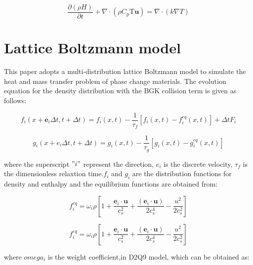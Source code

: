\begin{equation}\label {CE.C1}
\frac{\partial(\rho H)}{\partial t}+\nabla \cdot\left(\rho C_{\mathrm{p}} \mathrm{T} \boldsymbol{u}\right)=\nabla \cdot(k \nabla T)
\end{equation}
	

\section{Lattice Boltzmann model}
This paper adopts a multi-distribution lattice Boltzmann model to simulate the heat and mass transfer problem of phase change materials.   The evolution equation for the density distribution with the BGK collision term is given as follows:

\begin{equation}\label {LBM.BGK}
f_{i}\left(x+\boldsymbol{e}_{i} \Delta t, t+\Delta t\right)=f_{i}(x, t)-\frac{1}{\tau_{f}}\left[f_{i}(x, t)-f_{i}^{e q}(x, t)\right]+\Delta t F_{i}
	\end{equation}\label {LBM.BGK}
		
\begin{equation}\label {LBM.gi}		
		g_{i}\left(x+e_{i} \Delta t, t+\Delta t\right)=g_{i}(x, t)-\frac{1}{\tau_{g}}\left[g_{i}(x, t)-g_{i}^{e q}(x, t)\right] 
	\end{equation}\label {LBM.gi}

where the superscript $"i"$ represent the direction, $e_{i}$ is the  discrete velocity, $\tau_{f}$ is the dimensionless relaxtion time.$f_{i}$ and $g_{i}$ are the distribution functions for density and enthalpy and the equilibrium functions are obtained from:

\begin{equation}\label {LBM.fi-eq}
f_{i}^{e q}=\omega_{i} \rho\left[1+\frac{\boldsymbol{e}_{i} \cdot \boldsymbol{u}}{c_{s}^{2}}+\frac{\left(\boldsymbol{e}_{i} \cdot \boldsymbol{u}\right)}{2 c_{s}^{4}}-\frac{u^{2}}{2 c_{s}^{2}}\right]
\end{equation}\label {LBM.fi-eq}

\begin{equation}\label {LBM.gi-eq}
	f_{i}^{e q}=\omega_{i} \rho\left[1+\frac{\boldsymbol{e}_{i} \cdot \boldsymbol{u}}{c_{s}^{2}}+\frac{\left(\boldsymbol{e}_{i} \cdot \boldsymbol{u}\right)}{2 c_{s}^{4}}-\frac{u^{2}}{2 c_{s}^{2}}\right]
\end{equation}\label {LBM.gi-eq}

where $omega_{i}$ is the weight coefficient,in D2Q9 model, which can be obtained as:

